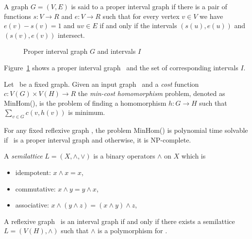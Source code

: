 \begin{defi}
A graph \(G=(V,E)\) is said to a proper interval graph if there is a pair of functions
\(s:V\to R\) and \(e: V\to R\) such that for every vertex \(v \in V\) 
we have \(e(v) - s(v) = 1\) and \(uv \in E\) if and only if the intervals
\((s(u),e(u))\) and \((s(v),e(v))\) intersect.
\end{defi}

\begin{figure}
\center
\caption{Proper interval graph \ensuremath{G} and intervals \ensuremath{I}}
\label{fig:pintv}
\end{figure}

Figure~\ref{fig:pintv} shows a proper interval graph \mG\ and the set of corresponding 
intervals \(I\)\@.

\begin{defi} [MinHom]
Let \mH\ be a fixed graph. Given an input graph \mG\ and a \emph{cost} function
\(c: V(G) \times V(H) \to R\) the \emph{min-cost homomorphism} problem,
denoted as MinHom(\mH), is the problem of finding a homomorphism 
\(h:G\to H\) such that \(\sum_{v\in G} c(v, h(v))\) is minimum.
\end{defi}

\begin{theorem} [TODO] \label{thm:minhom}
For any fixed reflexive graph \mH, the problem MinHom(\mH) is polynomial time solvable if
\mH\ is a proper interval graph and otherwise, it is NP-complete.
\end{theorem}

\begin{defi} [Semilattice]
A \emph{semilattice} \(L=(X,\wedge,\vee)\) is a binary operators \(\wedge\) on \(X\) which is
\begin{itemize}
\item idempotent: \(x \wedge x = x\),
\item commutative: \(x \wedge y = y \wedge x\),
\item associative: \(x \wedge (y \wedge z) = (x \wedge y) \wedge z\),
\end{itemize}
\end{defi}

\begin{theorem}[TODO] \label{thm:semimin}
A reflexive graph \mH\ is an interval graph if and only if there exists
a semilattice \(L=(V(H), \wedge)\) such that \(\wedge\) is a polymorphism for \mH\@.
\end{theorem}


